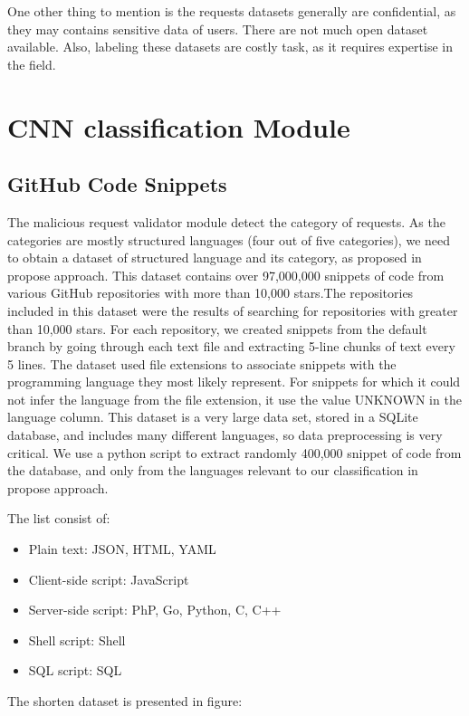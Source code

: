 One other thing to mention is the requests datasets generally are confidential, as they may contains sensitive data of users. There are not much open dataset available. Also, labeling these datasets are costly task, as it requires expertise in the field. 

\section{CNN classification Module}
\label{sec:CNN_module}
\subsection{GitHub Code Snippets}
The malicious request validator module detect the category of requests. As the categories are mostly structured languages (four out of five categories), we need to obtain a dataset of structured language and its category, as proposed in propose approach.
This dataset contains over 97,000,000 snippets of code from various GitHub repositories with more than 10,000 stars.The repositories included in this dataset were the results of searching for repositories with greater than 10,000 stars. For each repository, we created snippets from the default branch by going through each text file and extracting 5-line chunks of text every 5 lines. The dataset used file extensions to associate snippets with the programming language they most likely represent. For snippets for which it could not infer the language from the file extension, it use the value UNKNOWN in the language column.
This dataset is a very large data set, stored in a SQLite database, and includes many different languages, so data preprocessing is very critical. We use a python script to extract randomly 400,000 snippet of code from the database, and only from the languages relevant to our classification in propose approach.

The list consist of: 
\begin{itemize}
	\item Plain text: JSON, HTML, YAML
	\item Client-side script: JavaScript
	\item Server-side script: PhP, Go, Python, C, C++
	\item Shell script: Shell
	\item SQL script: SQL 
\end{itemize}

The shorten dataset is presented in figure:

